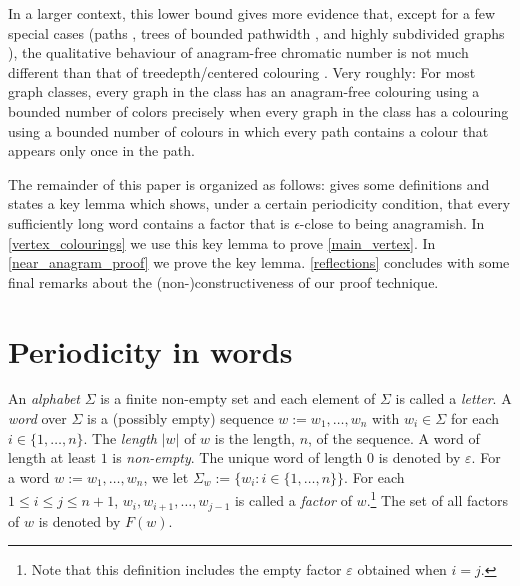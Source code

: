 \documentclass{patmorin}
\begin{document}
In a larger context, this lower bound gives more evidence that, except for a few special cases (paths \cite{evdokimov:strongly,pleasants:non-repetitive,keranen:abelian}, trees of bounded pathwidth \cite{wilson.wood:anagram-free}, and highly subdivided graphs \cite{wilson.wood:anagram-free2}), the qualitative behaviour of anagram-free chromatic number is not much different than that of treedepth/centered colouring \cite{nesetril.ossona:tree-depth}.  Very roughly: For most graph classes, every graph in the class has an anagram-free colouring using a bounded number of colors precisely when every graph in the class has a colouring using a bounded number of colours in which every path contains a colour that appears only once in the path.

%
%



The remainder of this paper is organized as follows:  gives some definitions and states a key lemma which shows, under a certain periodicity condition, that every sufficiently long word contains a factor that is $\epsilon$-close to being anagramish.
In \cref{vertex_colourings} we use this key lemma to prove \cref{main_vertex}.  In \cref{near_anagram_proof} we prove the key lemma. \cref{reflections} concludes with some final remarks about the (non-)constructiveness of our proof technique.

\section{Periodicity in words}
\label{near_anagram_statement}

An \emph{alphabet} $\Sigma$ is a finite non-empty set and each element of $\Sigma$ is called a \emph{letter}. A \emph{word} over $\Sigma$ is a (possibly empty) sequence $w:=w_1,\ldots,w_n$ with $w_i\in\Sigma$ for each $i\in\{1,\ldots,n\}$. The \emph{length} $|w|$ of $w$ is the length, $n$, of the sequence.  A word of length at least $1$ is \emph{non-empty}.  The unique word of length $0$ is denoted by $\varepsilon$. For a word $w:=w_1,\ldots,w_n$, we let $\Sigma_w:=\{w_i:i\in\{1,\ldots,n\}\}$.  For each $1 \le i \le j\le n+1$, $w_i,w_{i+1},\ldots,w_{j-1}$ is called a \emph{factor} of $w$.\footnote{Note that this definition includes the empty factor $\varepsilon$ obtained when $i=j$.}  The set of all factors of $w$ is denoted by $F(w)$.
\end{document}
